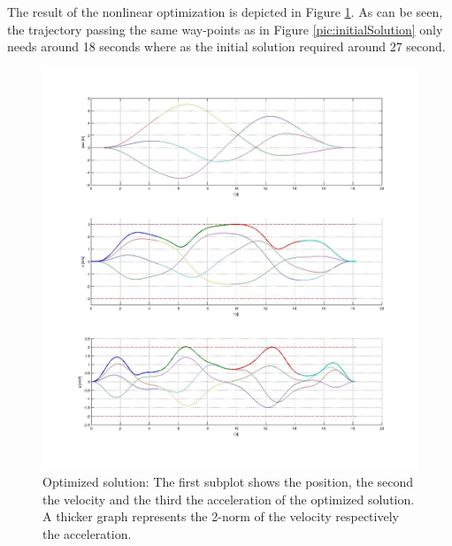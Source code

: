 The result of the nonlinear optimization is depicted in Figure \ref{pic:optimizedSolution}. As can be seen, the trajectory passing the same way-points as in Figure \ref{pic:initialSolution} only needs around 18 seconds where as the initial solution required around 27 second. 



\begin{figure}[h]
   \centering
   \includegraphics[width=1\textwidth]{pics/optimized.jpg}
   \caption{Optimized solution: The first subplot shows the position, the second the velocity and the third the acceleration of the optimized solution. A thicker graph represents the 2-norm of the velocity respectively the acceleration. }
   \label{pic:optimizedSolution}
\end{figure}

%
%



























